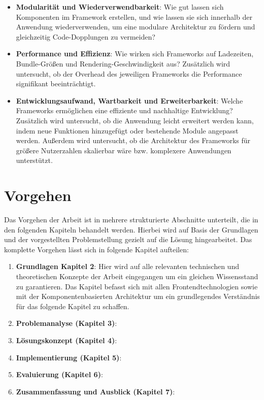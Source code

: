 \documentclass[oneside]{ausarbeitung}
\begin{document}
\begin{itemize}
    \item \textbf{Modularität und Wiederverwendbarkeit}:  
          Wie gut lassen sich Komponenten im Framework erstellen, und wie lassen sie sich innerhalb der Anwendung wiederverwenden, um eine modulare Architektur zu fördern und gleichzeitig Code-Dopplungen zu vermeiden?  
    \item \textbf{Performance und Effizienz}:  
          Wie wirken sich Frameworks auf Ladezeiten, Bundle-Größen und Rendering-Geschwindigkeit aus?  
          Zusätzlich wird untersucht, ob der Overhead des jeweiligen Frameworks die Performance signifikant beeinträchtigt.  
    \item \textbf{Entwicklungsaufwand, Wartbarkeit und Erweiterbarkeit}:  
          Welche Frameworks ermöglichen eine effiziente und nachhaltige Entwicklung?  
          Zusätzlich wird untersucht, ob die Anwendung leicht erweitert werden kann, indem neue Funktionen hinzugefügt oder bestehende Module angepasst werden.  
          Außerdem wird untersucht, ob die Architektur des Frameworks für größere Nutzerzahlen skalierbar wäre bzw. komplexere Anwendungen unterstützt.  
\end{itemize}

\section{Vorgehen}
\label{sec:vorgehen}

Das Vorgehen der Arbeit ist in mehrere strukturierte Abschnitte unterteilt, die in den folgenden Kapiteln behandelt werden. Hierbei wird auf Basis der Grundlagen und der vorgestellten Problemstellung gezielt auf die Lösung hingearbeitet. 
Das komplette Vorgehen lässt sich in folgende Kapitel aufteilen: 

\begin{enumerate}  
	\item \textbf{Grundlagen Kapitel 2}: Hier wird auf alle relevanten technischen und theoretischen Konzepte der Arbeit eingegangen um ein gleichen Wissensstand zu garantieren. Das Kapitel befasst sich mit allen Frontendtechnologien sowie mit der Komponentenbasierten Architektur um ein grundlegendes Verständnis für das folgende Kapitel zu schaffen. 
    \item \textbf{Problemanalyse (Kapitel 3)}: 
    \item \textbf{Lösungskonzept (Kapitel 4)}: 
    \item \textbf{Implementierung (Kapitel 5)}: 
    \item \textbf{Evaluierung (Kapitel 6)}:   
    \item \textbf{Zusammenfassung und Ausblick (Kapitel 7)}:	
\end{enumerate}  
\end{document}
